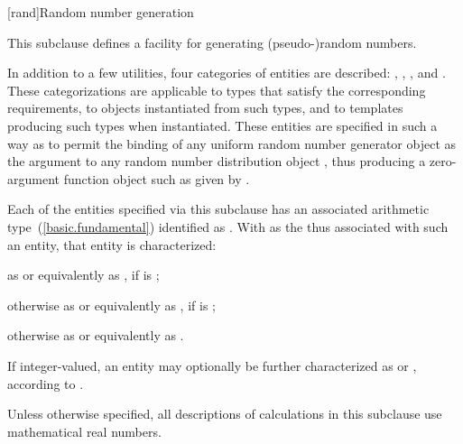 [rand]{Random number generation}

%
%
%
%

\pnum
This subclause defines a facility
for generating (pseudo-)random numbers.

\pnum
In addition to a few utilities,
four categories of entities are described:
,
,
,
and
.
These categorizations are applicable
to types that satisfy the corresponding requirements,
to objects instantiated from such types,
and to templates producing such types when instantiated.
\enternote
 These entities are specified in such a way
 as to permit the binding
 of any uniform random number generator object 
 as the argument
 to any random number distribution object ,
 thus producing a zero-argument function object
 such as given by
 .
\exitnote

\pnum
{}%
Each of the entities specified via this subclause
has an associated arithmetic type~(\ref{basic.fundamental})
identified as .
With  as the 
thus associated with such an entity,
that entity is characterized:
\begin{enumeratea}
 \item
   as  or equivalently as ,
   if  is ;
 \item
   otherwise
   as  or equivalently as ,
   if  is ;
 \item
   otherwise
   as  or equivalently as .
\end{enumeratea}
\noindent
If integer-valued,
an entity may optionally be further characterized as
 or ,
according to .

\pnum
Unless otherwise specified,
all descriptions of calculations
in this subclause
use mathematical real numbers.

